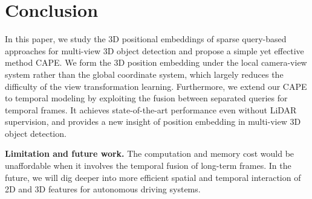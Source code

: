 \documentclass[10pt,twocolumn,letterpaper]{article}
\begin{document}
%
 \section{Conclusion}
\label{conclusion}
In this paper, we study the 3D positional embeddings of sparse query-based approaches for multi-view 3D object detection and propose a simple yet effective method CAPE. We form the 3D position embedding under the local camera-view system rather than the global coordinate system, which largely reduces the difficulty of the view transformation learning. Furthermore, we extend our CAPE to temporal modeling by exploiting the fusion between separated queries for temporal frames. It achieves state-of-the-art performance even without LiDAR supervision, and provides a new insight of position embedding in multi-view 3D object detection.


\noindent\textbf{Limitation and future work.}  The computation and memory cost would be unaffordable when it involves the temporal fusion of long-term frames. In the future, we will dig deeper into more efficient spatial and temporal interaction of 2D and 3D features for autonomous driving systems. 


{\small


}
\end{document}
